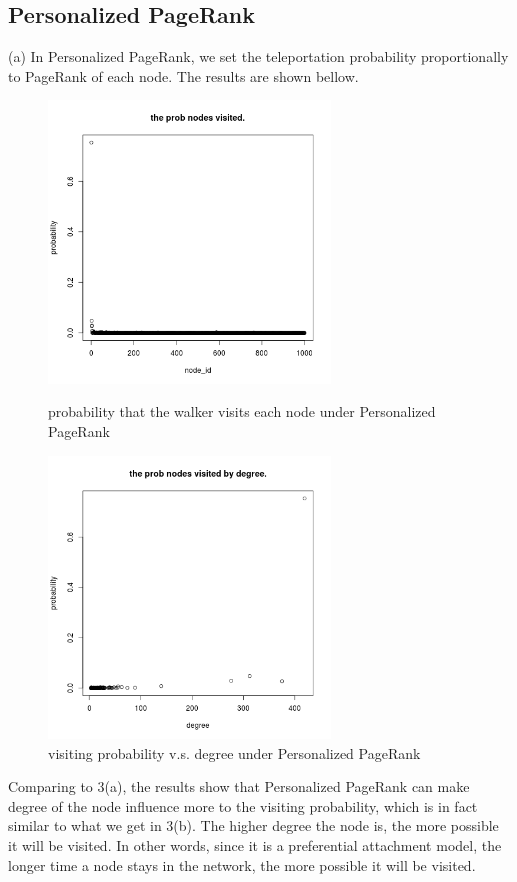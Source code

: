 \documentclass[draftcls,12pt,onecolumn]{IEEEtran}
\begin{document}
\subsection{Personalized PageRank}
(a) In Personalized PageRank, we set the teleportation probability proportionally to PageRank of each node. The results are shown bellow.
\begin{figure}[htbp]
\centering
\begin{minipage}[t]{0.48\textwidth}
\centering
\includegraphics[width=7.5cm]{4_a_rw_prob.png}
\caption{probability that the walker visits each node under Personalized PageRank}
\label{fig23}
\end{minipage}
\begin{minipage}[t]{0.48\textwidth}
\centering
\includegraphics[width=7.5cm]{4_a_rw_prob_by_degree.png}
\caption{visiting probability v.s. degree under Personalized PageRank}
\label{fig24}
\end{minipage}
\end{figure}
Comparing to 3(a), the results show that Personalized PageRank can make degree of the node influence more to the visiting probability, which is in fact similar to what we get in 3(b). The higher degree the node is, the more possible it will be visited. In other words, since it is a preferential attachment model, the longer time a node stays in the network, the more possible it will be visited. 
\end{document}
